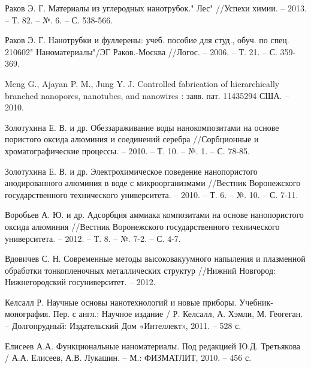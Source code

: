 \begin{thebibliography}{00}
Раков Э. Г. Материалы из углеродных нанотрубок." Лес" //Успехи химии. – 2013. – Т. 82. – №. 6. – С. 538-566.

Раков Э. Г. Нанотрубки и фуллерены: учеб. пособие для студ., обуч. по спец. 210602" Наноматериалы"/ЭГ Раков.-Москва //Логос. – 2006. – Т. 21. – С. 359-369.

Meng G., Ajayan P. M., Jung Y. J. Controlled fabrication of hierarchically branched nanopores, nanotubes, and nanowires : заяв. пат. 11435294 США. – 2010.

Золотухина Е. В. и др. Обеззараживание воды нанокомпозитами на основе пористого оксида алюминия и соединений серебра //Сорбционные и хроматографические процессы. – 2010. – Т. 10. – №. 1. – С. 78-85.

Золотухина Е. В. и др. Электрохимическое поведение нанопористого анодированного алюминия в воде с микроорганизмами //Вестник Воронежского государственного технического университета. – 2010. – Т. 6. – №. 10. – С. 7-11.

Воробьев А. Ю. и др. Адсорбция аммиака композитами на основе нанопористого оксида алюминия //Вестник Воронежского государственного технического университета. – 2012. – Т. 8. – №. 7-2. – С. 4-7.

Вдовичев С. Н. Современные методы высоковакуумного напыления и плазменной обработки тонкопленочных металлических структур //Нижний Новгород: Нижнегородский госуниверситет. – 2012.

Келсалл Р. Научные основы нанотехнологий и новые приборы. Учебник-монография. Пер. с англ.: Научное издание / Р. Келсалл, А. Хэмли, М. Геогеган. – Долгопрудный: Издательский Дом «Интеллект», 2011. – 528 с.

 Елисеев А.А. Функциональные наноматериалы. Под редакцией Ю.Д. Третьякова / А.А. Елисеев, А.В. Лукашин. – М.: ФИЗМАТЛИТ, 2010. – 456 с.

\end{thebibliography}
\endgroup

\clearpage
